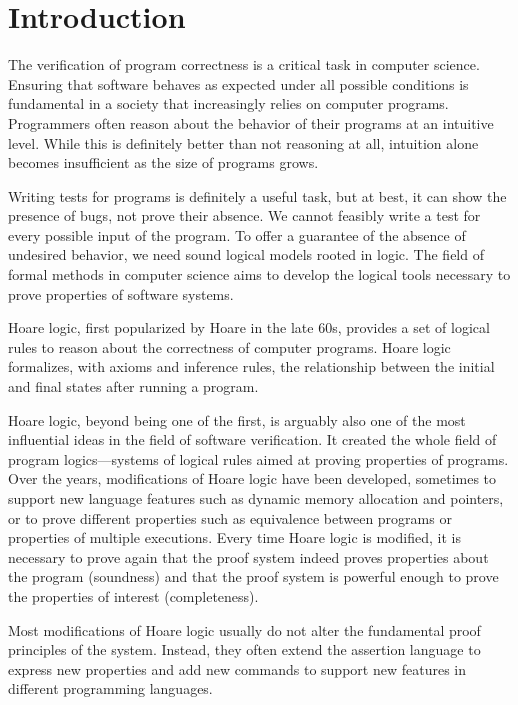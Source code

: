 \chapter*{Introduction}


The verification of program correctness is a critical task in computer science.
Ensuring that software behaves as expected under all possible conditions is
fundamental in a society that increasingly relies on computer programs.
Programmers often reason about the behavior of their programs at an intuitive
level. While this is definitely better than not reasoning at all, intuition
alone becomes insufficient as the size of programs grows.

Writing tests for programs is definitely a useful task, but at best, it can
show the presence of bugs, not prove their absence. We cannot feasibly write a
test for every possible input of the program. To offer a guarantee of the
absence of undesired behavior, we need sound logical models rooted in logic.
The field of formal methods in computer science aims to develop the logical
tools necessary to prove properties of software systems.

Hoare logic, first popularized by Hoare in the late 60s, provides a set of
logical rules to reason about the correctness of computer programs. Hoare logic
formalizes, with axioms and inference rules, the relationship between the
initial and final states after running a program.

Hoare logic, beyond being one of the first, is arguably also one of the most
influential ideas in the field of software verification. It created the whole
field of program logics—systems of logical rules aimed at proving properties of
programs. Over the years, modifications of Hoare logic have been developed,
sometimes to support new language features such as dynamic memory allocation
and pointers, or to prove different properties such as equivalence between
programs or properties of multiple executions. Every time Hoare logic is
modified, it is necessary to prove again that the proof system indeed proves
properties about the program (soundness) and that the proof system is powerful
enough to prove the properties of interest (completeness).

Most modifications of Hoare logic usually do not alter the fundamental proof
principles of the system. Instead, they often extend the assertion language to
express new properties and add new commands to support new features in
different programming languages.

